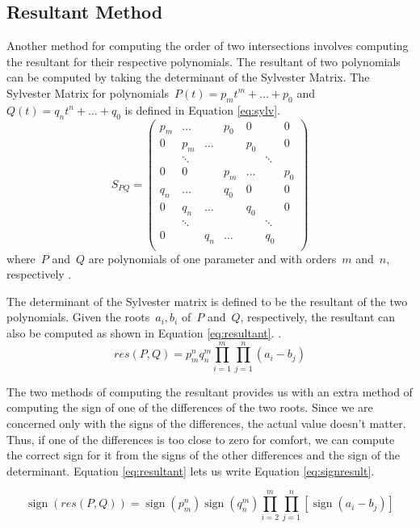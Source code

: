 \documentclass{cccg16}
\DeclareMathOperator{\sign}{sign}
\begin{document}
\subsection{Resultant Method}
Another method for computing the order of two intersections involves
computing the resultant for their respective polynomials.  The
resultant of two polynomials can be computed by taking the determinant
of the Sylvester Matrix.  The Sylvester Matrix for
polynomials~$P(t)=p_m t^m + \dots + p_0$ and~$Q(t)=q_n t^n + \dots +
q_0$ is defined in Equation \ref{eq:sylv}.
\begin{equation}
  S_{PQ}=\begin{pmatrix}
    p_m & \dots & & p_0 & 0 & & 0\\
    0 & p_m & \dots & & p_0 & & 0\\
    & \ddots & & & & \ddots\\
    0 & 0 & & p_m & \dots & & p_0\\
    q_n & \dots & & q_0 & 0 & & 0\\
    0 & q_n & \dots & & q_0 & & 0\\
    & \ddots & & & & \ddots\\
    0 & & q_n & \dots & & q_0\\
  \end{pmatrix}
  \label{eq:sylv}
\end{equation}
where~$P$ and~$Q$ are polynomials of one parameter and with orders~$m$
and~$n$, respectively \cite[Section~3.5]{cheeyap}.

The determinant of the Sylvester matrix is defined to be the resultant
of the two polynomials.  Given the roots~$a_i, b_i$ of~$P$ and~$Q$,
respectively, the resultant can also be computed as shown in Equation
\ref{eq:resultant}. \cite[Section~6.4]{cheeyap}.
\begin{equation}
  res(P, Q)=p_m^n q_n^m \prod_{i=1}^m\prod_{j=1}^n (a_i-b_j)
  \label{eq:resultant}
\end{equation}

The two methods of computing the resultant provides us with an extra
method of computing the sign of one of the differences of the two
roots.  Since we are concerned only with the signs of the differences,
the actual value doesn't matter.  Thus, if one of the differences is
too close to zero for comfort, we can compute the correct sign for it
from the signs of the other differences and the sign of the
determinant.  Equation \ref{eq:resultant} lets us write Equation
\ref{eq:signresult}.

\begin{equation}
  \sign(res(P, Q)) =
  \sign(p_m^n)\sign(q_n^m)\prod_{i=2}^m\prod_{j=1}^n[\sign(a_i-b_j)]
  \label{eq:signresult}
\end{equation}
\end{document}
